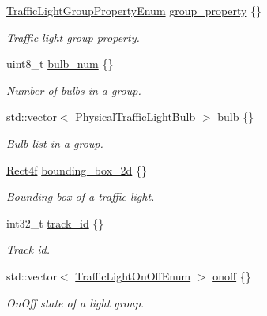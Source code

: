 \begin{DoxyCompactItemize}
\hyperlink{structmaf__perception__interface_1_1TrafficLightGroupPropertyEnum}{Traffic\+Light\+Group\+Property\+Enum} \hyperlink{structmaf__perception__interface_1_1PhysicalTrafficLightMultiFrame_a1ceae9e6fc4ac83002641895db4fed81}{group\+\_\+property} \{\}
\begin{DoxyCompactList}\small\item\em Traffic light group property. \end{DoxyCompactList}\item 
uint8\+\_\+t \hyperlink{structmaf__perception__interface_1_1PhysicalTrafficLightMultiFrame_afb1124db9ee2902046336118a3a7c8c5}{bulb\+\_\+num} \{\}
\begin{DoxyCompactList}\small\item\em Number of bulbs in a group. \end{DoxyCompactList}\item 
std\+::vector$<$ \hyperlink{structmaf__perception__interface_1_1PhysicalTrafficLightBulb}{Physical\+Traffic\+Light\+Bulb} $>$ \hyperlink{structmaf__perception__interface_1_1PhysicalTrafficLightMultiFrame_a4a62a439bf13c7b04941e6859ea7b758}{bulb} \{\}
\begin{DoxyCompactList}\small\item\em Bulb list in a group. \end{DoxyCompactList}\item 
\hyperlink{structmaf__perception__interface_1_1Rect4f}{Rect4f} \hyperlink{structmaf__perception__interface_1_1PhysicalTrafficLightMultiFrame_a752a3190e54de98a1c28bf89f089390a}{bounding\+\_\+box\+\_\+2d} \{\}
\begin{DoxyCompactList}\small\item\em Bounding box of a traffic light. \end{DoxyCompactList}\item 
int32\+\_\+t \hyperlink{structmaf__perception__interface_1_1PhysicalTrafficLightMultiFrame_a981b83e96b3d2c3e11c443bf91c960bf}{track\+\_\+id} \{\}
\begin{DoxyCompactList}\small\item\em Track id. \end{DoxyCompactList}\item 
std\+::vector$<$ \hyperlink{structmaf__perception__interface_1_1TrafficLightOnOffEnum}{Traffic\+Light\+On\+Off\+Enum} $>$ \hyperlink{structmaf__perception__interface_1_1PhysicalTrafficLightMultiFrame_a96976899022f622c7ff346500bfa76d9}{onoff} \{\}
\begin{DoxyCompactList}\small\item\em On\+Off state of a light group. \end{DoxyCompactList}\item 

\end{DoxyCompactItemize}
